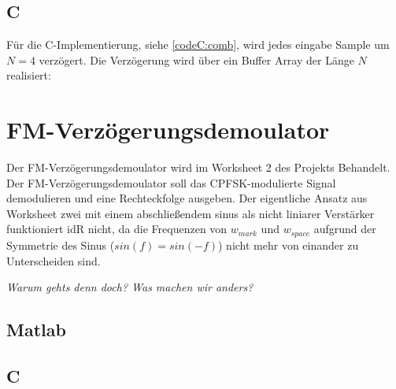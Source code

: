 \documentclass{article}
\begin{document}
\subsection{C}
Für die C-Implementierung, siehe \ref{codeC:comb}, wird jedes eingabe Sample um $N = 4$ verzögert.
Die Verzögerung wird über ein Buffer Array der Länge $N$ realisiert:
% 
%
%
%            
%

\section{FM-Verzögerungsdemoulator} \label{sec:fm-demod}
Der FM-Verzögerungsdemoulator wird im Worksheet 2 des Projekts Behandelt. 
Der FM-Verzögerungsdemoulator soll das CPFSK-modulierte Signal demodulieren und eine Rechteckfolge ausgeben.
Der eigentliche Ansatz aus Worksheet zwei mit einem abschließendem sinus als nicht liniarer Verstärker funktioniert idR nicht, 
da die Frequenzen von $w_{mark}$ und $w_{space}$ aufgrund der Symmetrie des Sinus ($sin(f) = sin(-f)$) nicht mehr von einander zu Unterscheiden sind.

\textit{Warum gehts denn doch? Was machen wir anders?}
\subsection{Matlab}

\subsection{C}
\end{document}

